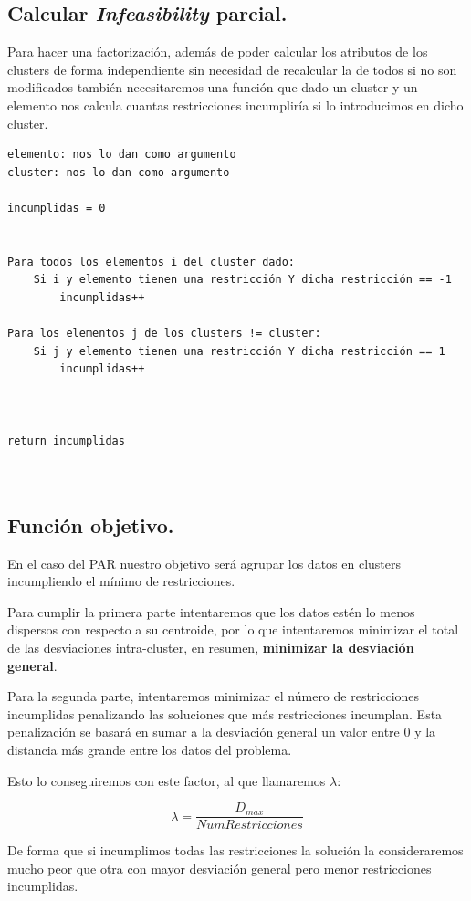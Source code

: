 \documentclass[12pt, spanish]{article}
\begin{document}
\subsection{Calcular \textit{Infeasibility} parcial.}

Para hacer una factorización, además de poder calcular los atributos de los clusters de forma independiente sin necesidad de recalcular la de todos si no son modificados también necesitaremos una función que dado un cluster y un elemento nos calcula cuantas restricciones incumpliría si lo introducimos en dicho cluster.


\begin{lstlisting}
elemento: nos lo dan como argumento
cluster: nos lo dan como argumento

incumplidas = 0


Para todos los elementos i del cluster dado:
	Si i y elemento tienen una restricción Y dicha restricción == -1
		incumplidas++

Para los elementos j de los clusters != cluster:
	Si j y elemento tienen una restricción Y dicha restricción == 1
		incumplidas++



return incumplidas
	
	
\end{lstlisting}

\subsection{Función objetivo.}

En el caso del PAR nuestro objetivo será agrupar los datos en clusters incumpliendo el mínimo de restricciones.

Para cumplir la primera parte intentaremos que los datos estén lo menos dispersos con respecto a su centroide, por lo que intentaremos minimizar el total de las desviaciones intra-cluster, en resumen, \textbf{minimizar la desviación general}. 

Para la segunda parte, intentaremos minimizar el número de restricciones incumplidas penalizando las soluciones que más restricciones incumplan. Esta penalización se basará en sumar a la desviación general un valor entre 0 y la distancia más grande entre los datos del problema.

Esto lo conseguiremos con este factor, al que llamaremos $\lambda$:

$$ \lambda = \frac{D_{max}}{NumRestricciones} $$ 


De forma que si incumplimos todas las restricciones la solución la consideraremos mucho peor que otra con mayor desviación general pero menor restricciones incumplidas.
\end{document}
